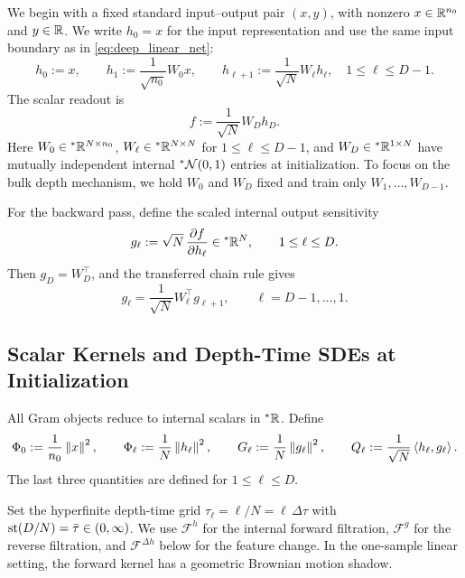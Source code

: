We begin with a fixed standard input--output pair $(x, y)$, with nonzero $x \in \mathbb{R}^{n_0}$ and $y \in \mathbb{R}$. We write $h_0 = x$ for the input representation and use the same input boundary as in \eqref{eq:deep_linear_net}:
\begin{equation}
\label{eq:ch6-fl-forward}
h_0 := x, \qquad
h_1 := \frac{1}{\sqrt{n_0}} W_0 x, \qquad
h_{\ell+1} := \frac{1}{\sqrt{N}} W_\ell h_\ell, \quad 1 \le \ell \le D - 1.
\end{equation}
The scalar readout is
\begin{equation}
\label{eq:ch6-fl-readout}
f := \frac{1}{\sqrt{N}} W_D h_D.
\end{equation}
Here $W_0 \in {}^*\mathbb{R}^{N \times n_0}$, $W_\ell \in {}^*\mathbb{R}^{N \times N}$ for $1 \le \ell \le D - 1$, and $W_D \in {}^*\mathbb{R}^{1 \times N}$ have mutually independent internal ${}^*\mathcal{N}(0, 1)$ entries at initialization. To focus on the bulk depth mechanism, we hold $W_0$ and $W_D$ fixed and train only $W_1, \dots, W_{D-1}$.

For the backward pass, define the scaled internal output sensitivity
\begin{equation}
\label{eq:ch6-fl-g-def}
g_\ell := \sqrt{N}\,\frac{\partial f}{\partial h_\ell} \in {}^*\mathbb{R}^N, \qquad 1 \le \ell \le D.
\end{equation}
Then $g_D = W_D^\top$, and the transferred chain rule gives
\begin{equation}
\label{eq:ch6-fl-g-rec}
g_\ell = \frac{1}{\sqrt{N}} W_\ell^\top g_{\ell+1}, \qquad \ell = D - 1, \dots, 1.
\end{equation}

\subsection{Scalar Kernels and Depth-Time SDEs at Initialization}
\label{subsec:scalar-kernels-init}

All Gram objects reduce to internal scalars in ${}^*\mathbb{R}$. Define
\begin{equation}
\label{eq:ch6-scalar-grams}
\Phi_0 := \frac{1}{n_0}\left\lVert x \right\rVert^2, \qquad
\Phi_\ell := \frac{1}{N}\left\lVert h_\ell \right\rVert^2, \qquad
G_\ell := \frac{1}{N}\left\lVert g_\ell \right\rVert^2, \qquad
Q_\ell := \frac{1}{\sqrt{N}}\left\langle h_\ell, g_\ell \right\rangle.
\end{equation}
The last three quantities are defined for $1 \le \ell \le D$.

Set the hyperfinite depth-time grid $\tau_\ell = \ell / N = \ell\,\Delta\tau$ with $\operatorname{st}(D/N) = \bar{\tau} \in (0, \infty)$. We use $\mathcal{F}^h$ for the internal forward filtration, $\mathcal{F}^g$ for the reverse filtration, and $\mathcal{F}^{\Delta h}$ below for the feature change. In the one-sample linear setting, the forward kernel has a geometric Brownian motion shadow.

